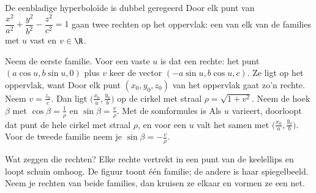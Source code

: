\begin{theorie}
\begin{minipage}[t]{.7\linewidth}
\vspace{0pt}
\begin{stelling}{De eenbladige hyperboloïde is dubbel geregeerd}
Door elk punt van $\dfrac{x^2}{a^2} + \dfrac{y^2}{b^2} - \dfrac{z^2}{c^2} = 1$ gaan twee rechten op het oppervlak: een van elk van de families
met $u$ vast en $v \in \R$.
\end{stelling}
\end{minipage}\hfill
\begin{minipage}[t]{.26\linewidth}
\vspace{0pt}
\centering
{}
\end{minipage}

\begin{bewijs}
Neem de eerste familie. Voor een vaste $u$ is dat een rechte: het punt $(a\cos u, b\sin u, 0)$ plus $v$ keer de vector $(-a\sin u, b\cos u, c)$. Ze ligt op het oppervlak, want
Door elk punt $(x_0, y_0, z_0)$ van het oppervlak gaat zo'n rechte. Neem $v = \tfrac{z_0}{c}$. Dan ligt $\bigl(\tfrac{x_0}{a}, \tfrac{y_0}{b}\bigr)$ op de cirkel met straal $\rho = \sqrt{1 + v^2}$. Neem de hoek $\beta$ met $\cos\beta = \tfrac1\rho$ en $\sin\beta = \tfrac v\rho$. Met de somformules is
Als $u$ varieert, doorloopt dat punt de hele cirkel met straal $\rho$, en voor een $u$ valt het samen met $\bigl(\tfrac{x_0}{a}, \tfrac{y_0}{b}\bigr)$. Voor de tweede familie neem je $\sin\beta = -\tfrac v\rho$.
\end{bewijs}
\end{theorie}

Wat zeggen die rechten? Elke rechte vertrekt in een punt van de keelellips en loopt schuin omhoog. De figuur toont één familie; de andere is haar spiegelbeeld. Neem je rechten van beide families, dan kruisen ze elkaar en vormen ze een net.

